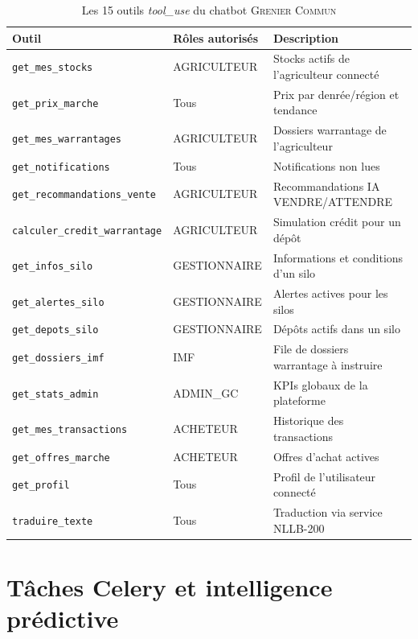 \documentclass[12pt,a4paper,twoside]{report}
\newcommand{\gc}{\textsc{Grenier Commun}}
\begin{document}
\begin{table}[H]
\centering
\caption{Les 15 outils \textit{tool\_use} du chatbot \gc{}}
\label{tab:outils_chatbot}
\begin{tabular}{L{4cm}L{4cm}L{6cm}}
\toprule
\textbf{Outil} & \textbf{Rôles autorisés} & \textbf{Description} \\
\midrule
\texttt{get\_mes\_stocks}          & AGRICULTEUR & Stocks actifs de l'agriculteur connecté \\
\texttt{get\_prix\_marche}         & Tous        & Prix par denrée/région et tendance \\
\texttt{get\_mes\_warrantages}     & AGRICULTEUR & Dossiers warrantage de l'agriculteur \\
\texttt{get\_notifications}        & Tous        & Notifications non lues \\
\texttt{get\_recommandations\_vente} & AGRICULTEUR & Recommandations IA VENDRE/ATTENDRE \\
\texttt{calculer\_credit\_warrantage} & AGRICULTEUR & Simulation crédit pour un dépôt \\
\texttt{get\_infos\_silo}          & GESTIONNAIRE & Informations et conditions d'un silo \\
\texttt{get\_alertes\_silo}        & GESTIONNAIRE & Alertes actives pour les silos \\
\texttt{get\_depots\_silo}         & GESTIONNAIRE & Dépôts actifs dans un silo \\
\texttt{get\_dossiers\_imf}        & IMF         & File de dossiers warrantage à instruire \\
\texttt{get\_stats\_admin}         & ADMIN\_GC   & KPIs globaux de la plateforme \\
\texttt{get\_mes\_transactions}    & ACHETEUR    & Historique des transactions \\
\texttt{get\_offres\_marche}       & ACHETEUR    & Offres d'achat actives \\
\texttt{get\_profil}               & Tous        & Profil de l'utilisateur connecté \\
\texttt{traduire\_texte}           & Tous        & Traduction via service NLLB-200 \\
\bottomrule
\end{tabular}
\end{table}

\section{Tâches Celery et intelligence prédictive}
\label{sec:celery_tasks}
\end{document}
